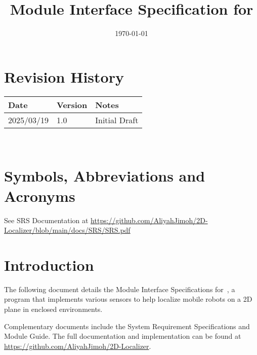 \documentclass[12pt, titlepage]{article}
\begin{document}
\title{Module Interface Specification for \progname{}}

\author{\authname}

\date{\today}

\maketitle


\section{Revision History}

\begin{tabularx}{\textwidth}{p{3cm}p{2cm}X}
\toprule {\bf Date} & {\bf Version} & {\bf Notes}\\
\midrule
2025/03/19 & 1.0 & Initial Draft\\
\bottomrule
\end{tabularx}

~\newpage

\section{Symbols, Abbreviations and Acronyms}

See SRS Documentation at \url{https://github.com/AliyahJimoh/2D-Localizer/blob/main/docs/SRS/SRS.pdf}


\newpage

\tableofcontents

\newpage


\section{Introduction}

The following document details the Module Interface Specifications for~\progname, a program that implements various sensors to help localize mobile robots on a 2D plane in enclosed environments.

Complementary documents include the System Requirement Specifications
and Module Guide.  The full documentation and implementation can be
found at \url{https://github.com/AliyahJimoh/2D-Localizer}.
\end{document}
